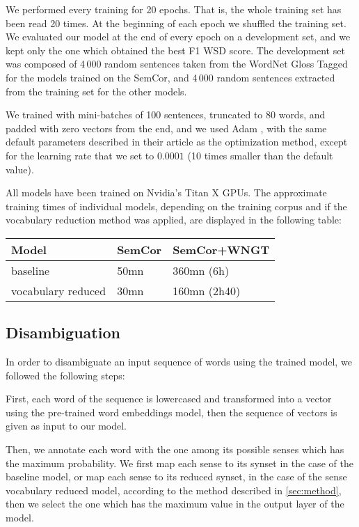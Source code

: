 \documentclass[11pt,a4paper]{article}
\begin{document}
We performed every training for 20 epochs. That is, the whole training set has been read 20 times. At the beginning of each epoch we shuffled the training set. We evaluated our model at the end of every epoch on a development set, and we kept only the one which obtained the best F1 WSD score. The development set was composed of 4\,000 random sentences taken from the WordNet Gloss Tagged for the models trained on the SemCor, and 4\,000 random sentences extracted from the training set for the other models.



We trained with mini-batches of 100 sentences, truncated to 80 words, and padded with zero vectors from the end, and we used Adam \cite{KingmaB14}, with the same default parameters described in their article as the optimization method, except for the learning rate that we set to $0.0001$ (10 times smaller than the default value).

All models have been trained on Nvidia's Titan X GPUs. The approximate training times of individual models, depending on the training corpus and if the vocabulary reduction method was applied, are displayed in the following table: 


\begin{table}[h]
\small
\centering
\tabulinesep=2pt
\begin{tabu} to \linewidth {X[1lm]|X[1cm]|X[1.3cm]}
Model & SemCor & SemCor+WNGT \\
\midrule
baseline & 50mn & 360mn (6h) \\
\midrule
vocabulary reduced & 30mn & 160mn (2h40) \\
\end{tabu}
\label{tab:times}
\end{table}







\subsection{Disambiguation}

In order to disambiguate an input sequence of words using the trained model, we followed the following steps: 

First, each word of the sequence is lowercased and transformed into a vector using the pre-trained word embeddings model, then the sequence of vectors is given as input to our model.

Then, we annotate each word with the one among its possible senses which has the maximum probability. We first map each sense to its synset in the case of the baseline model, or map each sense to its reduced synset, in the case of the sense vocabulary reduced model, according to the method described in \autoref{sec:method}, then we select the one which has the maximum value in the output layer of the model.
\end{document}
